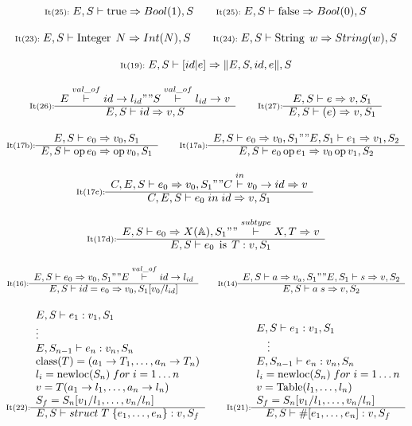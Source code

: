 {
\footnotesize
\[
\textnormal{{\scriptsize It(25):}}\; E, S\vdash\operatorname{true}\Rightarrow Bool(1),S
\quad\quad
\textnormal{{\scriptsize It(25):}}\; E, S\vdash\operatorname{false}\Rightarrow Bool(0),S
\]

\[
\textnormal{{\scriptsize It(23):}}\; E, S\vdash\operatorname{Integer}\; N\Rightarrow Int(N),S
\quad\quad
\textnormal{{\scriptsize It(24):}}\; E, S\vdash\operatorname{String}\; w\Rightarrow String(w),S
\]

\[
\textnormal{{\scriptsize It(19):}}\; E, S\vdash \left[id \vert e \right] \Rightarrow \lVert E,S, id, e\rVert,S
\]

\[
\inference[It(26):]{
E\overset{val\_of}{|-}id->l_{id} "" S\overset{val\_of}{|-}l_{id}->v
}{E, S|-id=>v,S}
\quad\quad
\inference[It(27):]{
E, S|-e=>v,S_1
}
{E, S|-(e)=>v,S_1}
\]

\[
\inference[It(17b):]{
E, S|-e_0=>v_0,S_1
}{E, S|-\operatorname{op}e_0=>\operatorname{op}v_0,S_1}
\quad\quad
\inference[It(17a):]{
E, S|-e_0=>v_0,S_1 "" E, S_1|-e_1=>v_1,S_2
}{E, S|-e_0\operatorname{op}e_1=>v_0\operatorname{op}v_1,S_2}
\]

\[
\inference[It(17c):]{
C, E, S|-e_0=>v_0,S_1 "" C \overset {in} {|-} v_0->id =>v
}{C, E, S|-e_0 \; in \; id=>v,S_1}
\quad\quad
\]

\[
\inference[It(17d):]{
E, S|-e_0=>X(\mathbb{A}),S_1 "" \overset{subtype}{|-} X, T \Rightarrow v
}{E, S|-e_0\; \operatorname{is} \; T:v,S_1}
\]

\[
\inference[It(16):]
{
E,S|-e_0=>v_0,S_1 "" E\overset{val\_of}{|-}id->l_{id}
}
{E, S|-id = e_0=>v_0, S_1[v_0/l_{id}]}
\quad\quad
\inference[It(14)]
{
E, S|-a=>v_a,S_1 "" E, S_1|-s=>v,S_2
}
{E, S|-a\;s=>v,S_2}
\]

\[
\inference[It(22):]
{
E,S|-e_1:v_1,S_1 \\
\vdots \\
E,S_{n-1}|-e_n:v_n,S_n \\
\operatorname{class}(T)=(a_1->T_1, \dots, a_n->T_n) \\  %
l_i = \operatorname{newloc}(S_n) \; for \; i = 1 \dots n \\
v=T(a_1->l_1, \dots, a_n->l_n) \\ %
S_f = S_n[v_1/l_1, \dots, v_n/l_n]
}
{E, S|-struct\;T\;\{ e_1, \ldots, e_n \}:v,S_f}
\quad\quad
\inference[It(21):]
{
E,S|-e_1:v_1,S_1 \\
\quad \vdots \\
E,S_{n-1}|-e_n:v_n,S_n \\
l_i = \operatorname{newloc}(S_n) \; for \; i = 1 \dots n \\
v=\operatorname{Table}(l_1, \dots, l_n) \\
S_f = S_n[v_1/l_1, \dots, v_n/l_n]
}
{E, S|-\#[e_1, \dots, e_n]:v,S_f}
\]

}
